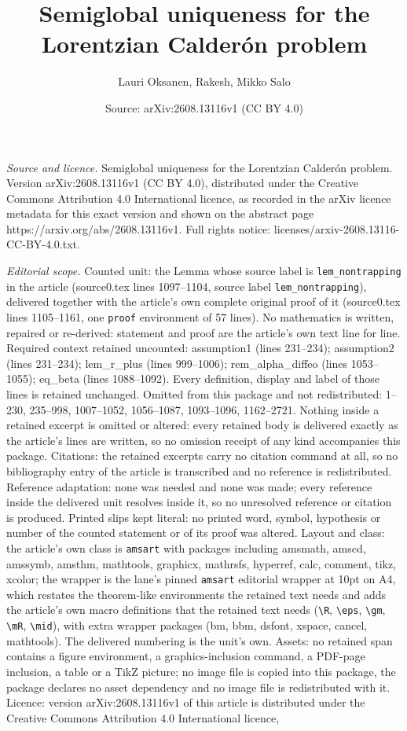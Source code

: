 \documentclass[10pt,a4paper]{amsart}
\title[Semiglobal uniqueness for the Lorentzian Calder\'on problem]{Semiglobal uniqueness for the Lorentzian Calder\'on problem}
\author{Lauri Oksanen, Rakesh, Mikko Salo}
\date{Source: arXiv:2608.13116v1 (CC BY 4.0)}
\begin{document}
\maketitle

\noindent\emph{Source and licence.} Semiglobal uniqueness for the Lorentzian Calder\'on problem. Version arXiv:2608.13116v1 (CC BY 4.0), distributed under the Creative Commons Attribution 4.0 International licence, as recorded in the arXiv licence metadata for this exact version and shown on the abstract page https://arxiv.org/abs/2608.13116v1. Full rights notice: licenses/arxiv-2608.13116-CC-BY-4.0.txt.\par\smallskip

\noindent\textit{Editorial scope.} Counted unit: the Lemma whose source label is \texttt{lem\_nontrapping} in the article (source0.tex lines 1097--1104, source label \texttt{lem\_nontrapping}), delivered together with the article's own complete original proof of it (source0.tex lines 1105--1161, one \texttt{proof} environment of 57 lines). No mathematics is written, repaired or re-derived: statement and proof are the article's own text line for line. Required context retained uncounted: assumption1 (lines 231--234); assumption2 (lines 231--234); lem\_r\_plus (lines 999--1006); rem\_alpha\_diffeo (lines 1053--1055); eq\_beta (lines 1088--1092). Every definition, display and label of those lines is retained unchanged. Omitted from this package and not redistributed: 1--230, 235--998, 1007--1052, 1056--1087, 1093--1096, 1162--2721. Nothing inside a retained excerpt is omitted or altered: every retained body is delivered exactly as the article's lines are written, so no omission receipt of any kind accompanies this package. Citations: the retained excerpts carry no citation command at all, so no bibliography entry of the article is transcribed and no reference is redistributed. Reference adaptation: none was needed and none was made; every reference inside the delivered unit resolves inside it, so no unresolved reference or citation is produced. Printed slips kept literal: no printed word, symbol, hypothesis or number of the counted statement or of its proof was altered. Layout and class: the article's own class is \texttt{amsart} with packages including amsmath, amscd, amssymb, amsthm, mathtools, graphicx, mathrsfs, hyperref, calc, comment, tikz, xcolor; the wrapper is the lane's pinned \texttt{amsart} editorial wrapper at 10pt on A4, which restates the theorem-like environments the retained text needs and adds the article's own macro definitions that the retained text needs (\texttt{\textbackslash R}, \texttt{\textbackslash eps}, \texttt{\textbackslash gm}, \texttt{\textbackslash mR}, \texttt{\textbackslash mid}), with extra wrapper packages (bm, bbm, dsfont, xspace, cancel, mathtools). The delivered numbering is the unit's own. Assets: no retained span contains a figure environment, a graphics-inclusion command, a PDF-page inclusion, a table or a TikZ picture; no image file is copied into this package, the package declares no asset dependency and no image file is redistributed with it. Licence: version arXiv:2608.13116v1 of this article is distributed under the Creative Commons Attribution 4.0 International licence, 
\end{document}
